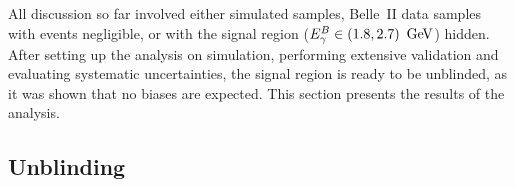 All discussion so far involved either simulated samples, Belle~II data samples with \BtoXsgamma events negligible,
or with the signal region (${E^B_{\gamma}}\in(1.8,2.7)~\mathrm{\,Ge\kern -0.1em V}$) hidden.
After setting up the analysis on simulation, performing extensive validation and evaluating systematic uncertainties, 
the signal region is ready to be unblinded, as it was shown that no biases are expected.
This section presents the results of the analysis.

\subsection{Unblinding}
